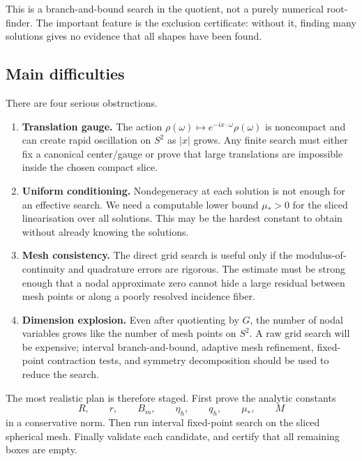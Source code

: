 \documentclass[12pt]{article}
\begin{document}
This is a branch-and-bound search in the quotient, not a purely numerical
root-finder. The important feature is the exclusion certificate: without it,
finding many solutions gives no evidence that all shapes have been found.

\subsection{Main difficulties}

There are four serious obstructions.
\begin{enumerate}[leftmargin=2em]
  \item \textbf{Translation gauge.} The action
    $\rho(\omega)\mapsto e^{-ix\cdot\omega}\rho(\omega)$ is noncompact and
    can create rapid oscillation on $S^2$ as $|x|$ grows. Any finite search
    must either fix a canonical center/gauge or prove that large translations
    are impossible inside the chosen compact slice.

  \item \textbf{Uniform conditioning.} Nondegeneracy at each solution is not
    enough for an effective search. We need a computable lower bound
    $\mu_*>0$ for the sliced linearisation over all solutions. This may be the
    hardest constant to obtain without already knowing the solutions.

  \item \textbf{Mesh consistency.} The direct grid search is useful only if the
    modulus-of-continuity and quadrature errors are rigorous. The estimate must
    be strong enough that a nodal approximate zero cannot hide a large residual
    between mesh points or along a poorly resolved incidence fiber.

  \item \textbf{Dimension explosion.} Even after quotienting by $G$, the number
    of nodal variables grows like the number of mesh points on $S^2$. A raw
    grid search will be expensive; interval branch-and-bound, adaptive mesh
    refinement, fixed-point contraction tests, and symmetry decomposition
    should be used to reduce the search.
\end{enumerate}

The most realistic plan is therefore staged. First prove the analytic constants
\[
  R,\qquad r,\qquad B_m,\qquad \eta_h,\qquad q_h,\qquad \mu_*,\qquad M
\]
in a conservative norm. Then run interval fixed-point search on the sliced
spherical mesh. Finally validate each candidate, and certify that all remaining
boxes are empty.
\end{document}
